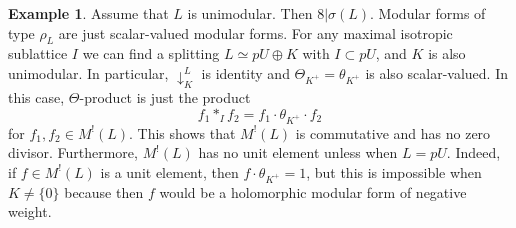 \documentclass[12pt]{amsart}
\numberwithin{equation}{section}
\theoremstyle{definition}
\newtheorem{example}[theorem]{Example}
\theoremstyle{remark}
\newcommand{\pushLK}{\downarrow^{L}_{K}}
\newcommand{\ThetaK}{\Theta_{K^{+}}}
\newcommand{\ML}{M^{!}(L)}
\begin{document}
\begin{example}\label{ex: unimodular}
Assume that $L$ is unimodular. 
Then $8 | \sigma(L)$. 
Modular forms of type $\rho_{L}$ are just scalar-valued modular forms. 
For any maximal isotropic sublattice $I$ we can find a splitting $L\simeq pU \oplus K$ with $I\subset pU$, 
and $K$ is also unimodular. 
In particular, ${\pushLK}$ is identity and 
${\ThetaK}=\theta_{K^{+}}$ is also scalar-valued. 
In this case, $\Theta$-product is just the product 
\begin{equation*}
f_1 \ast_{I} f_{2} = f_1 \cdot \theta_{K^{+}} \cdot f_2 
\end{equation*}
for $f_1, f_2\in {\ML}$. 
This shows that ${\ML}$ is commutative and has no zero divisor.  
Furthermore, ${\ML}$ has no unit element unless when $L=pU$. 
Indeed, if $f\in {\ML}$ is a unit element, then $f\cdot \theta_{K^{+}}=1$, 
but this is impossible when $K\ne \{ 0 \}$ 
because %
then $f$ would be a holomorphic modular form of negative weight. 
\end{example}
\end{document}
